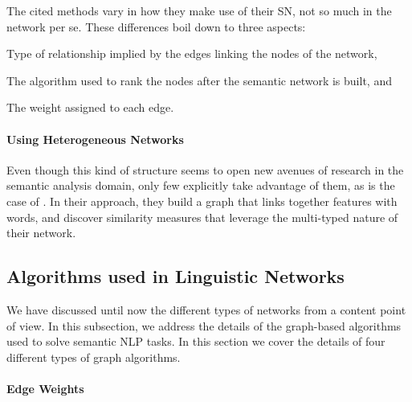 The cited methods vary in how they make use of their SN, not so much in the network per se. These differences boil down to three aspects:
\begin{bulletList}
\item Type of relationship implied by the edges linking the nodes of the network, 
\item The algorithm used to rank the nodes after the semantic network is built, and
\item The weight assigned to each edge.
\end{bulletList}

\paragraph{Using Heterogeneous Networks}

Even though this kind of structure seems to open new avenues of research in the semantic analysis domain, only few explicitly take advantage of them, as is the case of \cite{2013.Saluja.Graph-BasedUnsupervisedLearning}. In their approach, they build a graph that links together features with words, and discover similarity measures that leverage the multi-typed nature of their network.


\subsection{Algorithms used in Linguistic Networks}

We have discussed until now the different types of networks from a content point of view. In this subsection, we address the details of the graph-based algorithms used to solve semantic NLP tasks. In this section we cover the details of four different types of graph algorithms.



\paragraph{Edge Weights}

